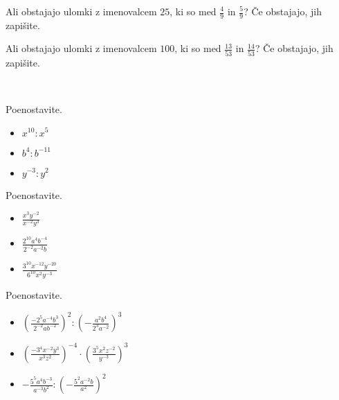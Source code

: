         
                    \begin{naloga}
                        Ali obstajajo ulomki z imenovalcem $25$, ki so med $\frac{4}{9}$ in $\frac{5}{9}$? Če obstajajo, jih zapišite.
                        
                    \end{naloga}
        
                    \begin{naloga}
                        Ali obstajajo ulomki z imenovalcem $100$, ki so med $\frac{13}{53}$ in $\frac{14}{53}$? Če obstajajo, jih zapišite.
                        
                    \end{naloga}
        
        

                    
    \newpage



    ~
            \begin{naloga}
                Poenostavite.
                \begin{itemize}
                    \item $x^{10}:x^5$ 
                    \item $b^4:b^{-11}$ 
                    \item $y^{-3}:y^2$ 
                \end{itemize}
            \end{naloga}

            \begin{naloga}
                Poenostavite.
                \begin{itemize}
                    \item $\frac{x^3y^{-2}}{x^{-2}y^3}$ 
                    \item $\frac{2^{10}a^4b^{-4}}{2^{-2}a^{-2}b}$ 
                    \item $\frac{3^{10}x^{-12}y^{-20}}{6^{10}x^2y^{-3}}$ 
                \end{itemize}
            \end{naloga}


            \begin{naloga}
                Poenostavite.
                \begin{itemize}
                    \item $\left(\frac{-2^5a^{-4}b^3}{2^{-2}ab^{-2}}\right)^2:\left(-\frac{a^2b^4}{2^3a^{-2}}\right)^3$ 
                    \item $\left(\frac{-3^4x^{-2}y^3}{x^3z^2}\right)^{-4}\cdot\left(\frac{3^5x^2z^{-2}}{y^{-3}}\right)^3$ 
                    \item $-\frac{5^5a^4b^{-3}}{a^{-3}b^2}:\left(-\frac{5^2a^{-2}b}{a^2}\right)^2$ 
                \end{itemize}
            \end{naloga}


